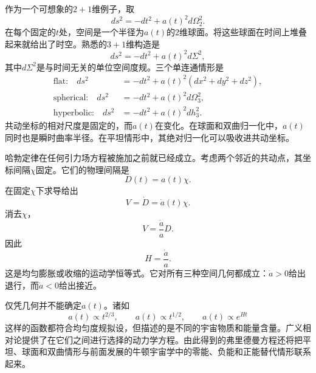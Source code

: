 作为一个可想象的\(2+1\)维例子，取
\begin{equation}
ds^2 = -dt^2 + a(t)^2 d\Omega_2^2.
\label{eq:c03-two-plus-one}
\end{equation}
在每个固定的\(t\)处，空间是一个半径为\(a(t)\)的\(2\)维球面。将这些球面在时间上堆叠起来就给出了时空。熟悉的\(3+1\)维构造是
\begin{equation}
ds^2 = -dt^2 + a(t)^2 d\Sigma^2,
\label{eq:c03-frw-general}
\end{equation}
其中\(d\Sigma^2\)是与时间无关的单位空间度规。三个单连通情形是
\begin{align}
\text{flat:}\quad
ds^2&=-dt^2+a(t)^2\left(dx^2+dy^2+dz^2\right),\label{eq:c03-frw-flat}\\
\text{spherical:}\quad
ds^2&=-dt^2+a(t)^2d\Omega_3^2,\label{eq:c03-frw-spherical}\\
\text{hyperbolic:}\quad
ds^2&=-dt^2+a(t)^2dh_3^2.\label{eq:c03-frw-hyperbolic}
\end{align}
共动坐标的相对尺度是固定的，而\(a(t)\)在变化。在球面和双曲归一化中，\(a(t)\)同时也是瞬时曲率半径。在平坦情形中，其绝对归一化可以吸收进共动坐标。

哈勃定律在任何引力场方程被施加之前就已经成立。考虑两个邻近的共动点，其坐标间隔\(\chi\)固定。它们的物理间隔是
\begin{equation}
D(t)=a(t)\chi.
\label{eq:c03-comoving-distance}
\end{equation}
在固定\(\chi\)下求导给出
\begin{equation}
V=\dot D=\dot a(t)\chi.
\end{equation}
消去\(\chi\)，
\begin{equation}
V = \frac{\dot a}{a} D.
\label{eq:c03-hubble-law}
\end{equation}
因此
\begin{equation}
H = \frac{\dot a}{a}.
\label{eq:c03-hubble-parameter}
\end{equation}
这是均匀膨胀或收缩的运动学恒等式。它对所有三种空间几何都成立：\(\dot a>0\)给出退行，而\(\dot a<0\)给出接近。

仅凭几何并不能确定\(a(t)\)。诸如
\begin{equation}
a(t)\propto t^{2/3},
\qquad
a(t)\propto t^{1/2},
\qquad
a(t)\propto e^{Ht}
\end{equation}
这样的函数都符合均匀度规拟设，但描述的是不同的宇宙物质和能量含量。广义相对论提供了在它们之间进行选择的动力学方程。由此得到的弗里德曼方程还将把平坦、球面和双曲情形与前面发展的牛顿宇宙学中的零能、负能和正能替代情形联系起来。

